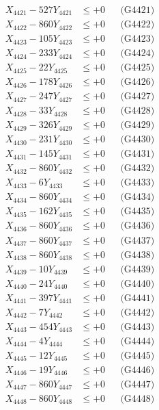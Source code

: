 \documentclass[a4paper,10pt]{article}
\begin{document}
{\begin{align}
\allowbreak
X_{4421} - 527Y_{4421} &\leq +0 && \text{(G4421)} \\
X_{4422} - 860Y_{4422} &\leq +0 && \text{(G4422)} \\
X_{4423} - 105Y_{4423} &\leq +0 && \text{(G4423)} \\
X_{4424} - 233Y_{4424} &\leq +0 && \text{(G4424)} \\
X_{4425} - 22Y_{4425} &\leq +0 && \text{(G4425)} \\
X_{4426} - 178Y_{4426} &\leq +0 && \text{(G4426)} \\
X_{4427} - 247Y_{4427} &\leq +0 && \text{(G4427)} \\
X_{4428} - 33Y_{4428} &\leq +0 && \text{(G4428)} \\
X_{4429} - 326Y_{4429} &\leq +0 && \text{(G4429)} \\
X_{4430} - 231Y_{4430} &\leq +0 && \text{(G4430)} \\
\allowbreak
X_{4431} - 145Y_{4431} &\leq +0 && \text{(G4431)} \\
X_{4432} - 860Y_{4432} &\leq +0 && \text{(G4432)} \\
X_{4433} - 6Y_{4433} &\leq +0 && \text{(G4433)} \\
X_{4434} - 860Y_{4434} &\leq +0 && \text{(G4434)} \\
X_{4435} - 162Y_{4435} &\leq +0 && \text{(G4435)} \\
X_{4436} - 860Y_{4436} &\leq +0 && \text{(G4436)} \\
X_{4437} - 860Y_{4437} &\leq +0 && \text{(G4437)} \\
X_{4438} - 860Y_{4438} &\leq +0 && \text{(G4438)} \\
X_{4439} - 10Y_{4439} &\leq +0 && \text{(G4439)} \\
X_{4440} - 24Y_{4440} &\leq +0 && \text{(G4440)} \\
\allowbreak
X_{4441} - 397Y_{4441} &\leq +0 && \text{(G4441)} \\
X_{4442} - 7Y_{4442} &\leq +0 && \text{(G4442)} \\
X_{4443} - 454Y_{4443} &\leq +0 && \text{(G4443)} \\
X_{4444} - 4Y_{4444} &\leq +0 && \text{(G4444)} \\
X_{4445} - 12Y_{4445} &\leq +0 && \text{(G4445)} \\
X_{4446} - 19Y_{4446} &\leq +0 && \text{(G4446)} \\
X_{4447} - 860Y_{4447} &\leq +0 && \text{(G4447)} \\
X_{4448} - 860Y_{4448} &\leq +0 && \text{(G4448)} \\

\end{align}}
\end{document}
